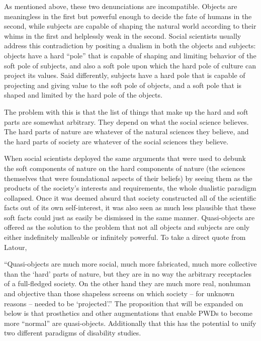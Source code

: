 \documentclass{lps}
\begin{document}
As mentioned above, these two denunciations are incompatible. Objects are meaningless in the first but powerful enough to decide the fate of humans in the second, while subjects are capable of shaping the natural world according to their whims in the first and helplessly weak in the second. Social scientists usually address this contradiction by positing a dualism in both the objects and subjects: objects have a hard “pole” that is capable of shaping and limiting behavior of the soft pole of subjects, and also a soft pole upon which the hard pole of culture can project its values. Said differently, subjects have a hard pole that is capable of projecting and giving value to the soft pole of objects, and a soft pole that is shaped and limited by the hard pole of the objects.

The problem with this is that the list of things that make up the hard and soft parts are somewhat arbitrary. They depend on what the social science believes. The hard parts of nature are whatever of the natural sciences they believe, and the hard parts of society are whatever of the social sciences they believe. 

When social scientists deployed the same arguments that were used to debunk the soft components of nature on the hard components of nature (the sciences themselves that were foundational aspects of their beliefs) by seeing them as the products of the society’s interests and requirements, the whole dualistic paradigm collapsed. Once it was deemed absurd that society constructed all of the scientific facts out of its own self-interest, it was also seen as much less plausible that these soft facts could just as easily be dismissed in the same manner.
Quasi-objects are offered as the solution to the problem that not all objects and subjects are only either indefinitely malleable or infinitely powerful. To take a direct quote from Latour,

“Quasi-objects are much more social, much more fabricated, much more collective than the ‘hard’ parts of nature, but they are in no way the arbitrary receptacles of a full-fledged society. On the other hand they are much more real, nonhuman and objective than those shapeless screens on which society – for unknown reasons – needed to be ‘projected’.”
The proposition that will be expanded on below is that prosthetics and other augmentations that enable PWDs to become more “normal” are quasi-objects. Additionally that this has the potential to unify two different paradigms of disability studies. 
\end{document}
